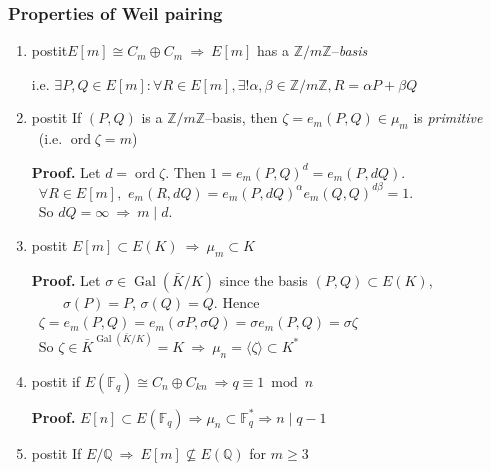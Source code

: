 \documentclass[12pt,handout]{beamer} %
\newcommand{\Q}{\mathbb Q}
\newcommand{\Z}{\mathbb Z}
\newcommand{\F}{\mathbb F}
\theoremstyle{definition}
\begin{document}
\begin{frame}
\frametitle{Properties of Weil pairing}

\begin{enumerate}[<+-| alert@+>]
  \item \begin{beamercolorbox}[shadow=true,center,rounded=true,wd=\textwidth]{postit}$E[m]\cong C_m\oplus C_m\ \Rightarrow\  E[m]$ has a $\Z/m\Z$--\emph{basis}\end{beamercolorbox}
\hspace*{-10mm}i.e. $\exists P,Q\in E[m]: \forall R\in E[m], \exists!\alpha,\beta\in\Z/m\Z, R=\alpha P+\beta Q$\hspace*{-15mm}
  \item \begin{beamercolorbox}[shadow=true,center,rounded=true,wd=\textwidth]{postit}
  If $(P, Q)$ is a $\Z/m\Z$--basis, then $\zeta=e_m(P,Q)\in\mu_m$ is \emph{primitive}\\\ \hfill \hfill (i.e. $\operatorname{ord}\zeta=m$)
\end{beamercolorbox}
  \textbf{Proof.} Let $d=\operatorname{ord}\zeta$. Then $1=e_m(P, Q)^d=e_m(P, dQ)$.\\
  \qquad\ $\forall R\in E[m],$ $e_m(R,dQ)=e_m(P,dQ)^\alpha e_m(Q,Q)^{d\beta}=1$.\\
  \qquad\ So $dQ=\infty\ \Rightarrow\ m\mid d$.
  \item\begin{beamercolorbox}[shadow=true,center,rounded=true,wd=\textwidth]{postit}
   $E[m]\subset E(K)\ \Rightarrow\ \mu_m\subset K$
\end{beamercolorbox}
  \textbf{Proof.} Let $\sigma\in\operatorname{Gal}(\bar{K}/K)$ %
 since the basis $(P,Q)\subset E(K)$,\\ $\qquad\ \sigma(P)=P$, $\sigma(Q)=Q$. Hence\\
 \qquad\ $\zeta= e_m(P,Q)=e_m(\sigma P,\sigma Q)=\sigma e_m(P,Q)=\sigma\zeta$\\
 \qquad\ So $\zeta\in \bar{K}^{\operatorname{Gal}(\bar{K}/K)}=K\ \Rightarrow\ \mu_n=\langle\zeta\rangle\subset K^*$
  \item \begin{beamercolorbox}[shadow=true,center,rounded=true,wd=\textwidth]{postit}
  if $E(\F_q)\cong C_n\oplus C_{kn}\ \Rightarrow q\equiv1\bmod n$
  \end{beamercolorbox}
  \textbf{Proof.} $E[n]\subset E(\F_q)\Rightarrow \mu_n\subset\F_q^*\Rightarrow n\mid q-1$
  \item \begin{beamercolorbox}[shadow=true,center,rounded=true,wd=\textwidth]{postit}
  If $E/\Q\ \Rightarrow\ E[m]\not\subseteq E(\Q)$ for $m\ge3$\end{beamercolorbox}
\end{enumerate}
\end{frame}
\end{document}
